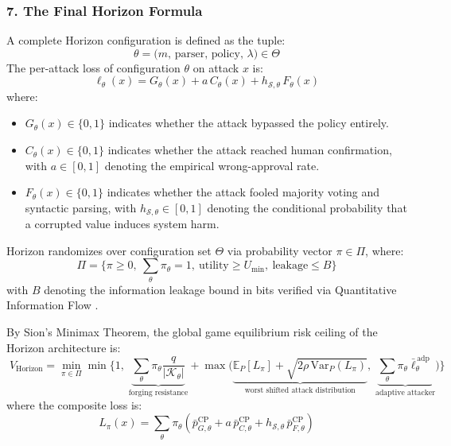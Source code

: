 \subsubsection{7. The Final Horizon Formula}
A complete Horizon configuration is defined as the tuple:
\begin{equation}
    \theta = \big(m,\, \text{parser},\, \text{policy},\, \lambda\big) \in \Theta
\end{equation}
The per-attack loss of configuration $\theta$ on attack $x$ is:
\begin{equation}
    \ell_\theta(x) = G_\theta(x) + a\,C_\theta(x) + h_{\mathcal{S},\theta}\,F_\theta(x)
\end{equation}
where:
\begin{itemize}
    \item $G_\theta(x) \in \{0, 1\}$ indicates whether the attack bypassed the policy entirely.
    \item $C_\theta(x) \in \{0, 1\}$ indicates whether the attack reached human confirmation, with $a \in [0, 1]$ denoting the empirical wrong-approval rate.
    \item $F_\theta(x) \in \{0, 1\}$ indicates whether the attack fooled majority voting and syntactic parsing, with $h_{\mathcal{S},\theta} \in [0, 1]$ denoting the conditional probability that a corrupted value induces system harm.
\end{itemize}

Horizon randomizes over configuration set $\Theta$ via probability vector $\pi \in \Pi$, where:
\begin{equation}
    \Pi = \Big\{\pi \ge 0, \ \textstyle\sum_\theta \pi_\theta = 1, \ \text{utility} \ge U_{\min}, \ \text{leakage} \le B\Big\}
\end{equation}
with $B$ denoting the information leakage bound in bits verified via Quantitative Information Flow \cite{smith2009qif}.

By Sion's Minimax Theorem, the global game equilibrium risk ceiling of the Horizon architecture is:
\begin{equation}
    \boxed{\;
    V_{\mathrm{Horizon}} = \min_{\pi \in \Pi} \min\Bigg\{1,\;
    \underbrace{\sum_\theta \pi_\theta \frac{q}{|\mathcal{K}_\theta|}}_{\text{forging resistance}}
    + \max\Big(
    \underbrace{\mathbb{E}_P[L_\pi] + \sqrt{2\rho\,\mathrm{Var}_P(L_\pi)}}_{\text{worst shifted attack distribution}},\;
    \underbrace{\sum_\theta \pi_\theta \bar{\ell}^{\,\mathrm{adp}}_\theta}_{\text{adaptive attacker}}
    \Big)\Bigg\}\;}
\end{equation}
where the composite loss is:
\begin{equation}
    L_\pi(x) = \sum_\theta \pi_\theta \left(\bar{p}^{\mathrm{CP}}_{G,\theta} + a\,\bar{p}^{\mathrm{CP}}_{C,\theta} + h_{\mathcal{S},\theta}\,\bar{p}^{\mathrm{CP}}_{F,\theta}\right)
\end{equation}

